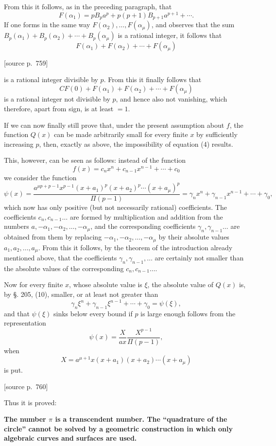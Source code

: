 \documentclass[11pt]{article}
\newcommand{\srcpage}[1]{\par\medskip\noindent\textsf{[source p.~#1]}\par\smallskip}
\begin{document}
From this it follows, as in the preceding paragraph, that
\[
F(\alpha_1)=pB_pa^p+p(p+1)B_{p+1}a^{p+1}+\cdots.
\]
If one forms in the same way $F(\alpha_2),\ldots,F(\alpha_\mu)$, and observes that the sum $B_p(\alpha_1)+B_p(\alpha_2)+\cdots+B_p(\alpha_\mu)$ is a rational integer, it follows that
\[
F(\alpha_1)+F(\alpha_2)+\cdots+F(\alpha_\mu)
\]
\srcpage{759}
is a rational integer divisible by $p$. From this it finally follows that
\[
CF(0)+F(\alpha_1)+F(\alpha_2)+\cdots+F(\alpha_\mu)
\]
is a rational integer not divisible by $p$, and hence also not vanishing, which therefore, apart from sign, is at least $=1$.

If we can now finally still prove that, under the present assumption about $f$, the function $Q(x)$ can be made arbitrarily small for every finite $x$ by sufficiently increasing $p$, then, exactly as above, the impossibility of equation (4) results.

This, however, can be seen as follows: instead of the function
\begin{equation}\tag{6}
f(x)=c_nx^n+c_{n-1}x^{n-1}+\cdots+c_0
\end{equation}
we consider the function
\[
\psi(x)=
\frac{a^{\mu p+p-1}x^{p-1}(x+a_1)^p(x+a_2)^p\cdots(x+a_\mu)^p}{\Pi(p-1)}
=\gamma_nx^n+\gamma_{n-1}x^{n-1}+\cdots+\gamma_0,
\]
which now has only positive (but not necessarily rational) coefficients. The coefficients $c_n,c_{n-1}\ldots$ are formed by multiplication and addition from the numbers $a,-\alpha_1,-\alpha_2,\ldots,-\alpha_\mu$, and the corresponding coefficients $\gamma_n,\gamma_{n-1}\ldots$ are obtained from them by replacing $-\alpha_1,-\alpha_2,\ldots,-\alpha_\mu$ by their absolute values $a_1,a_2,\ldots,a_\mu$. From this it follows, by the theorem of the introduction already mentioned above, that the coefficients $\gamma_n,\gamma_{n-1},\ldots$ are certainly not smaller than the absolute values of the corresponding $c_n,c_{n-1}\ldots$.

Now for every finite $x$, whose absolute value is $\xi$, the absolute value of $Q(x)$ is, by §. 205, (10), smaller, or at least not greater than
\[
\gamma_n\xi^n+\gamma_{n-1}\xi^{n-1}+\cdots+\gamma_0=\psi(\xi),
\]
and that $\psi(\xi)$ sinks below every bound if $p$ is large enough follows from the representation
\[
\psi(x)=\frac{X}{ax}\frac{X^{p-1}}{\Pi(p-1)},
\]
when
\[
X=a^{\mu+1}x(x+a_1)(x+a_2)\cdots(x+a_\mu)
\]
is put.

\srcpage{760}
Thus it is proved:

\begin{center}
\textbf{The number $\pi$ is a transcendent number. The ``quadrature of the circle'' cannot be solved by a geometric construction in which only algebraic curves and surfaces are used.}
\end{center}
\end{document}
